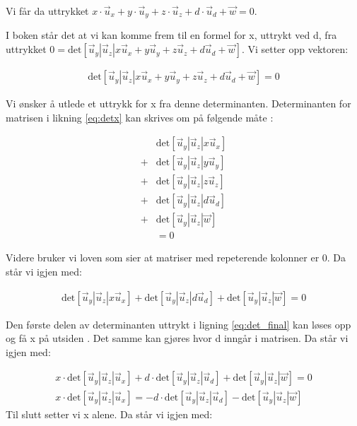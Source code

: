 Vi får da uttrykket $x\cdot{\vec u_x} + y\cdot{\vec u_y} + z\cdot{\vec u_z} + d\cdot{\vec u_d} + {\vec w} = 0$. \newpage


I boken står det at vi kan komme frem til en formel for x, uttrykt ved d, fra uttrykket $0=\text{det}[\vec{u}_y | \vec{u}_z | x\vec{u}_x + y\vec{u}_y + z\vec{u}_z + d\vec{u}_d + \vec{w}]$. Vi setter opp vektoren: 

\begin{align} \label{eq:detx}
	\text{det}[\vec{u}_y|\vec{u}_z |x\vec{u}_x + y\vec{u}_y + z\vec{u}_z + d\vec{u}_d + \vec{w}]=0
\end{align}

Vi ønsker å utlede et uttrykk for x fra denne determinanten. Determinanten for matrisen i likning \ref{eq:detx} kan skrives om på følgende måte \cite{TheDeterminant}: 

\begin{align}
	&\text{det}[\vec{u}_y|\vec{u}_z | x\vec{u}_x] \nonumber
	\\+ &\text{det}[\vec{u}_y|\vec{u}_z | y\vec{u}_y] \nonumber
	\\+ &\text{det}[\vec{u}_y|\vec{u}_z | z\vec{u}_z] \nonumber
	 \\+&\text{det}[\vec{u}_y|\vec{u}_z | d\vec{u}_d] \nonumber
	\\+ &\text{det}[\vec{u}_y|\vec{u}_z | \vec{w}]\nonumber
	\\&=0
\end{align}

Videre bruker vi loven som sier at matriser med repeterende kolonner er 0\cite{Determinants}. Da står vi igjen med: 

\begin{align} \label{eq:det_final}
	\text{det}[\vec{u}_y|\vec{u}_z | x\vec{u}_x] 
	+ \text{det}[\vec{u}_y|\vec{u}_z | d\vec{u}_d] 
	+ \text{det}[\vec{u}_y|\vec{u}_z | \vec{w}]
	=0
\end{align}

Den første delen av determinanten uttrykt i ligning \ref{eq:det_final} kan løses opp og få x på utsiden \cite{TheDeterminant}. Det samme kan gjøres hvor d inngår i matrisen. Da står vi igjen med: 

\begin{align}
	x\cdot\text{det}[\vec{u}_y|\vec{u}_z | \vec{u}_x] 
	+ d\cdot\text{det}[\vec{u}_y|\vec{u}_z | \vec{u}_d] 
	+ \text{det}[\vec{u}_y|\vec{u}_z | \vec{w}]
	=0 \nonumber 
	\\ 
	x\cdot\text{det}[\vec{u}_y|\vec{u}_z | \vec{u}_x] 
	= -d\cdot\text{det}[\vec{u}_y|\vec{u}_z | \vec{u}_d] 
	-\text{det}[\vec{u}_y|\vec{u}_z | \vec{w}]\nonumber 
\end{align}
Til slutt setter vi x alene. Da står vi igjen med: 

